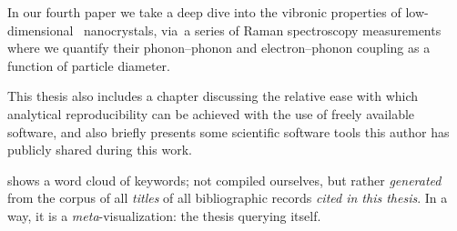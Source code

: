 \documentclass[draft,webedition,openright,titles,swedish,english]{LuaUUThesis}\usepackage[]{graphicx}\usepackage[]{xcolor}
\newcommand{\via}{via}
\begin{document}
In our fourth paper
we take a deep dive into the vibronic properties of low-dimensional \ZnO\ nanocrystals,
\via\ a series of Raman spectroscopy measurements where we quantify
their phonon--phonon and electron--phonon coupling as a function of particle diameter.


This thesis also includes a chapter discussing the relative ease with which
analytical reproducibility can be achieved with the use of freely available software,
and also briefly presents some scientific software tools
this author has publicly shared during this work.


 shows a word cloud of keywords;
not compiled ourselves, but rather \emph{generated}
from the corpus of all \emph{titles} of all bibliographic records
\emph{cited in this thesis}.
In a way, it is a \emph{meta}-visualization: the thesis querying itself.

%

%



%
\end{document}

